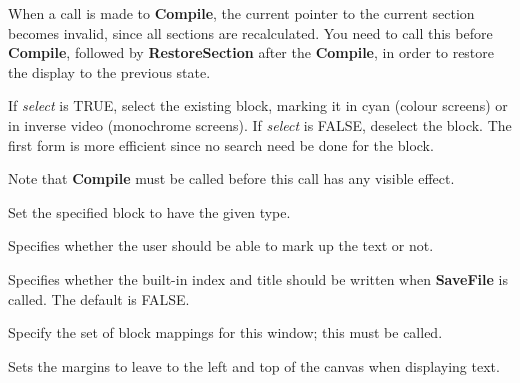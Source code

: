 
When a call is made to {\bf Compile}, the current pointer to the current
section becomes invalid, since all sections are recalculated. You need
to call this before {\bf Compile}, followed by {\bf RestoreSection} after
the {\bf Compile}, in order to restore the display to the previous state.




If {\it select} is TRUE, select the existing block, marking it in cyan
(colour screens) or in inverse video (monochrome screens).  If {\it
select} is FALSE, deselect the block. The first form is more efficient
since no search need be done for the block.

Note that {\bf Compile} must be called before this call has any visible effect.



Set the specified block to have the given type.



Specifies whether the user should be able to mark up the text or not.



Specifies whether the built-in index and title should be written when
{\bf SaveFile} is called. The default is FALSE.



Specify the set of block mappings for this window; this must be called.



Sets the margins to leave to the left and top of the canvas when
displaying text.

